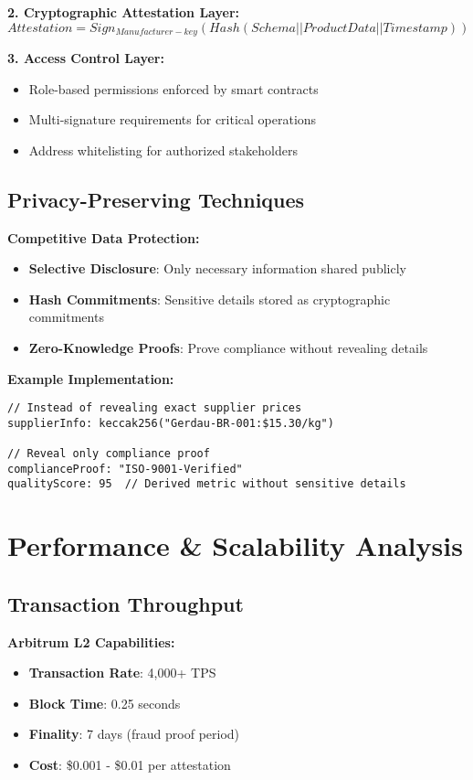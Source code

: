 \documentclass[11pt,a4paper]{article}
\begin{document}
\textbf{2. Cryptographic Attestation Layer:}
\begin{equation}
    Attestation = Sign_{Manufacturer-key}(Hash(Schema || ProductData || Timestamp))
\end{equation}

\textbf{3. Access Control Layer:}
\begin{itemize}[leftmargin=0.5cm]
    \item Role-based permissions enforced by smart contracts
    \item Multi-signature requirements for critical operations
    \item Address whitelisting for authorized stakeholders
\end{itemize}

\subsection{Privacy-Preserving Techniques}

\textbf{Competitive Data Protection:}
\begin{itemize}[leftmargin=0.5cm]
    \item \textbf{Selective Disclosure}: Only necessary information shared publicly
    \item \textbf{Hash Commitments}: Sensitive details stored as cryptographic commitments
    \item \textbf{Zero-Knowledge Proofs}: Prove compliance without revealing details
\end{itemize}

\textbf{Example Implementation:}
\begin{verbatim}
// Instead of revealing exact supplier prices
supplierInfo: keccak256("Gerdau-BR-001:$15.30/kg")

// Reveal only compliance proof
complianceProof: "ISO-9001-Verified"
qualityScore: 95  // Derived metric without sensitive details
\end{verbatim}

\section{Performance \& Scalability Analysis}

\subsection{Transaction Throughput}

\textbf{Arbitrum L2 Capabilities:}
\begin{itemize}[leftmargin=0.5cm]
    \item \textbf{Transaction Rate}: 4,000+ TPS
    \item \textbf{Block Time}: 0.25 seconds
    \item \textbf{Finality}: 7 days (fraud proof period)
    \item \textbf{Cost}: \$0.001 - \$0.01 per attestation
\end{itemize}
\end{document}
